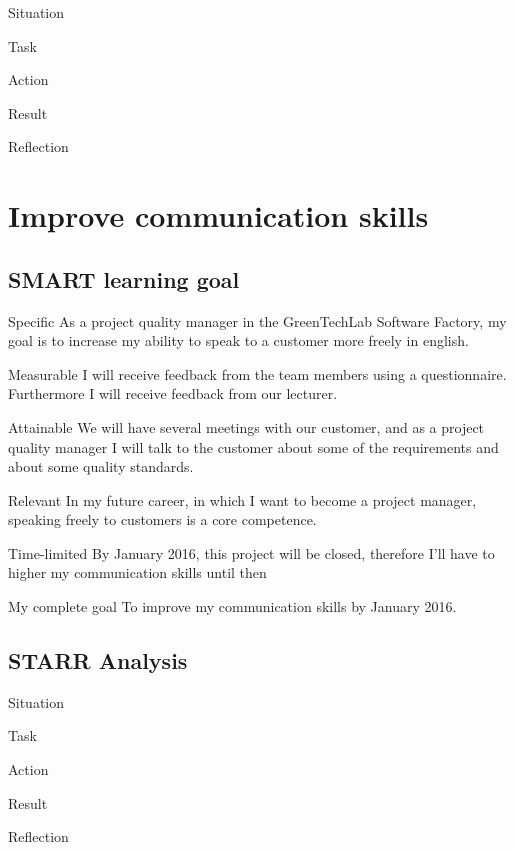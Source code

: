 \documentclass[12pt]{article}
\begin{document}
	\begin{STARR}
		\item[Situation]
		\item[Task]
		\item[Action]
		\item[Result]
		\item[Reflection]
	\end{STARR}
	
	\section{Improve communication skills}
	\subsection{SMART learning goal}
	\begin{SMART}
	    \item[Specific] As a project quality manager in the GreenTechLab Software Factory, my goal is to increase my ability to speak to a customer more freely in english.
	    \item[Measurable] I will receive feedback from the team members using a questionnaire. Furthermore I will receive feedback from our lecturer.
	    \item[Attainable] We will have several meetings with our customer, and as a project quality manager I will talk to the customer about some of the requirements and about some quality standards.
	    \item[Relevant] In my future career, in which I want to become a project manager, speaking freely to customers is a core competence.
	    \item[Time-limited] By January 2016, this project will be closed, therefore I’ll have to higher my communication skills until then
	    \item[My complete goal] To improve my communication skills by January 2016.
	\end{SMART}
	
	\subsection{STARR Analysis}
	\begin{STARR}
	    \item[Situation]
	    \item[Task]
	    \item[Action]
	    \item[Result]
	    \item[Reflection]
	\end{STARR}
	
\end{document}
